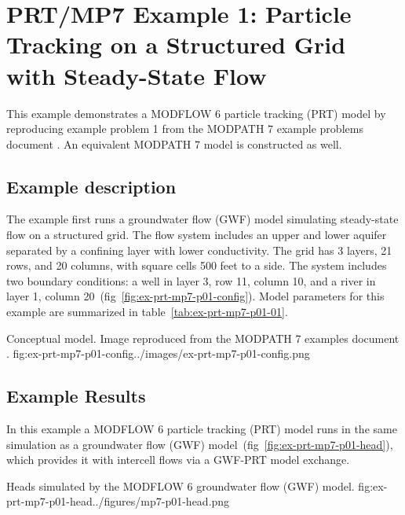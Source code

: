 \section{PRT/MP7 Example 1: Particle Tracking on a Structured Grid with Steady-State Flow}

This example demonstrates a MODFLOW 6 particle tracking (PRT) model by reproducing example problem 1 from the MODPATH 7 \citep{pollock2016modpath7} example problems document \citep{modpath7examples}. An equivalent MODPATH 7 model is constructed as well.

\subsection{Example description}

The example first runs a groundwater flow (GWF) model simulating steady-state flow on a structured grid. The flow system includes an upper and lower aquifer separated by a confining layer with lower conductivity. The grid has 3 layers, 21 rows, and 20 columns, with square cells 500 feet to a side. The system includes two boundary conditions: a well in layer 3, row 11, column 10, and a river in layer 1, column 20~(fig~\ref{fig:ex-prt-mp7-p01-config}). Model parameters for this example are summarized in table~\ref{tab:ex-prt-mp7-p01-01}.

\begin{StandardFigure}{
    Conceptual model. Image reproduced from the MODPATH 7 examples document \citep{modpath7examples}.
    }{fig:ex-prt-mp7-p01-config}{../images/ex-prt-mp7-p01-config.png}
\end{StandardFigure}



\subsection{Example Results}

In this example a MODFLOW 6 particle tracking (PRT) model runs in the same simulation as a groundwater flow (GWF) model~(fig~\ref{fig:ex-prt-mp7-p01-head}), which provides it with intercell flows via a GWF-PRT model exchange.

\begin{StandardFigure}{
    Heads simulated by the MODFLOW 6 groundwater flow (GWF) model.
    }{fig:ex-prt-mp7-p01-head}{../figures/mp7-p01-head.png}
\end{StandardFigure}

